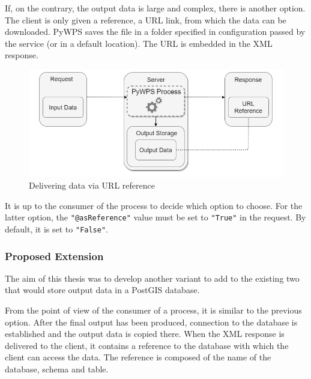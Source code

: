 If, on the contrary, the output data is large and complex, there is another option. The client is only given a reference, a URL link, from which the data can be downloaded. PyWPS saves the file in a folder specified in configuration passed by the service (or in a default location). The URL is embedded in the XML response. \cite{pywpsurl}

\begin{figure}[H] \centering
      \includegraphics[width=370pt]{./pictures/optiontwo.png}
      \caption[Delivering data via URL reference]{Delivering data via URL reference}
      \label{fig:optiontwo}
  \end{figure}

It is up to the consumer of the process to decide which option to choose. For the latter option, the \texttt{"@asReference"} value must be set to \texttt{"True"}  in the request. \cite{asref} By default, it is set to \texttt{"False"}.


\subsubsection{Proposed Extension} 

The aim of this thesis was to develop another variant to add to the existing two that would store output data in a PostGIS database.

From the point of view of the consumer of a process, it is similar to the previous option. After the final output has been produced, connection to the database is established and the output data is copied there. When the XML response is delivered to the client, it contains a reference to the database with which the client can access the data. The reference is composed of the name of the database, schema and table. 

